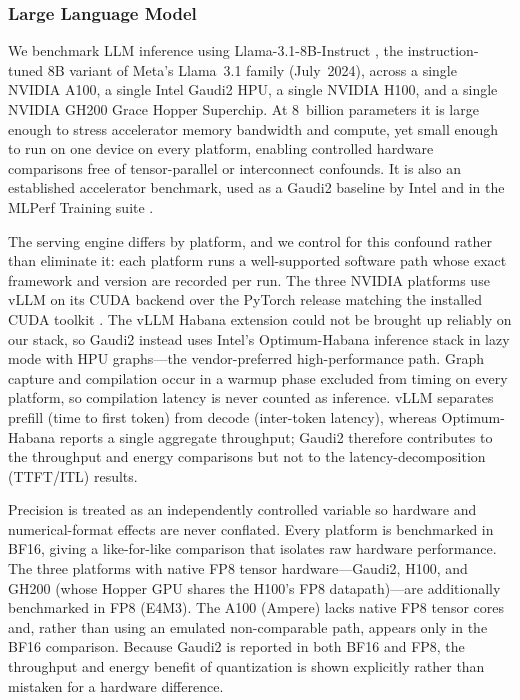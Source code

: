 \subsubsection{Large Language Model}
We benchmark LLM inference using Llama-3.1-8B-Instruct \cite{llama3.1-8b}, the
instruction-tuned 8B variant of Meta's Llama~3.1 family (July~2024), across a
single NVIDIA A100, a single Intel Gaudi2 HPU, a single NVIDIA H100, and a single
NVIDIA GH200 Grace Hopper Superchip. At 8~billion parameters it is large enough to
stress accelerator memory bandwidth and compute, yet small enough to run on one
device on every platform, enabling controlled hardware comparisons free of
tensor-parallel or interconnect confounds. It is also an established accelerator
benchmark, used as a Gaudi2 baseline by Intel \cite{intel2024gaudi2} and in the
MLPerf Training suite \cite{mlcommons}.

The serving engine differs by platform, and we control for this confound rather
than eliminate it: each platform runs a well-supported software path whose exact
framework and version are recorded per run. The three NVIDIA platforms use vLLM on
its CUDA backend over the PyTorch release matching the installed CUDA toolkit
\cite{pytorch}. The vLLM Habana extension could not be brought up reliably on our
stack, so Gaudi2 instead uses Intel's Optimum-Habana inference stack in lazy mode
with HPU graphs—the vendor-preferred high-performance path. Graph capture and
compilation occur in a warmup phase excluded from timing on every platform, so
compilation latency is never counted as inference. vLLM separates prefill (time to
first token) from decode (inter-token latency), whereas Optimum-Habana reports a
single aggregate throughput; Gaudi2 therefore contributes to the throughput and
energy comparisons but not to the latency-decomposition (TTFT/ITL) results.

Precision is treated as an independently controlled variable so hardware and
numerical-format effects are never conflated. Every platform is benchmarked in
BF16, giving a like-for-like comparison that isolates raw hardware performance. The
three platforms with native FP8 tensor hardware—Gaudi2, H100, and GH200 (whose
Hopper GPU shares the H100's FP8 datapath)—are additionally benchmarked in FP8
(E4M3). The A100 (Ampere) lacks native FP8 tensor cores and, rather than using an
emulated non-comparable path, appears only in the BF16 comparison. Because Gaudi2
is reported in both BF16 and FP8, the throughput and energy benefit of quantization
is shown explicitly rather than mistaken for a hardware difference.

